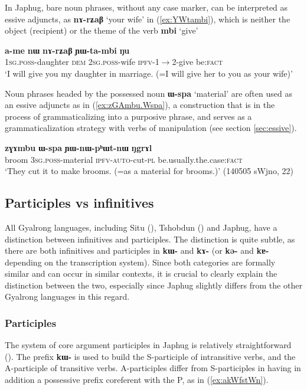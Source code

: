 \documentclass[oneside,a4paper,11pt]{article}
\newcommand{\ipa}[1]{\textbf{\phon#1}} %
\newcommand{\jpg}[2]{\ipa{#1} `#2'} %
\begin{document}
In Japhug, bare noun phrases, without any case marker, can be interpreted as essive adjuncts, as \ipa{nɤ-rʑaβ} `your wife' in (\ref{ex:YWtambi}), which is neither the object (recipient) or the theme of the verb \jpg{mbi}{give}

\begin{exe}
\ex \label{ex:YWtambi}
\gll \ipa{a-me} 	\ipa{nɯ} 	\ipa{nɤ-rʑaβ} 	\ipa{ɲɯ-ta-mbi} 	\ipa{ŋu} \\
\textsc{1sg.poss}-daughter \textsc{dem} \textsc{2sg.poss}-wife \textsc{ipfv}-1$\rightarrow$2-give be:\textsc{fact} \\
\glt `I will give you my daughter in marriage. (=I will give her to you as your wife)'
\end{exe}

Noun phrases headed by the possessed noun \jpg{ɯ-spa}{material} are often used as an essive adjuncts as in (\ref{ex:zGAmbu.Wspa}), a construction that is in the process of grammaticalizing into a purposive phrase, and serves as a grammaticalization strategy with verbs of manipulation (see section \ref{sec:essive}).

\begin{exe}
\ex \label{ex:zGAmbu.Wspa}
\gll \ipa{zɣɤmbu} 	\ipa{ɯ-spa} 	\ipa{ɲɯ-nɯ-pʰɯt-nɯ} 	\ipa{ŋgrɤl} \\
broom \textsc{3sg.poss}-material \textsc{ipfv-auto}-cut-\textsc{pl} be.usually.the.case:\textsc{fact} \\
\glt `They cut it to make brooms. (=as a material for brooms.)' (140505 sWjno, 22)
\end{exe}

\subsection{Participles vs infinitives} \label{sec:part.inf}
All Gyalrong languages, including Situ (\citealt{youjing03zhuokeji}), Tshobdun (\citealt{sun12complementation}) and Japhug, have a distinction between infinitives and participles. The distinction is quite subtle, as there are both infinitives and participles in \ipa{kɯ-} and \ipa{kɤ-} (or \ipa{kə-} and \ipa{kɐ-} depending on the transcription system). Since both categories are formally similar and can occur in similar contexts, it is crucial to clearly explain the distinction between the two, especially since Japhug slightly differs from the other Gyalrong languages in this regard.

\subsubsection{Participles}
The system of core argument participles in Japhug is relatively straightforward (\citealt{jacques16relatives}). The prefix \ipa{kɯ-} is used to build the S-participle of intransitive verbs, and the A-participle of transitive verbs. A-participles differ from S-participles in having in addition a possessive prefix coreferent with the P, as in (\ref{ex:akWfstWn}).
\end{document}

